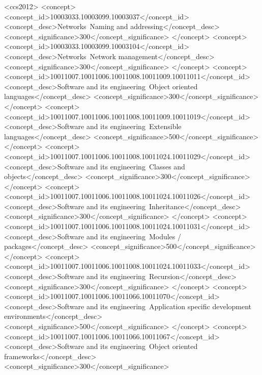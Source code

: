 \documentclass[sigconf]{acmart}
\begin{document}
\begin{CCSXML}
<ccs2012>
   <concept>
       <concept_id>10003033.10003099.10003037</concept_id>
       <concept_desc>Networks~Naming and addressing</concept_desc>
       <concept_significance>300</concept_significance>
       </concept>
   <concept>
       <concept_id>10003033.10003099.10003104</concept_id>
       <concept_desc>Networks~Network management</concept_desc>
       <concept_significance>300</concept_significance>
       </concept>
   <concept>
       <concept_id>10011007.10011006.10011008.10011009.10011011</concept_id>
       <concept_desc>Software and its engineering~Object oriented languages</concept_desc>
       <concept_significance>300</concept_significance>
       </concept>
   <concept>
       <concept_id>10011007.10011006.10011008.10011009.10011019</concept_id>
       <concept_desc>Software and its engineering~Extensible languages</concept_desc>
       <concept_significance>500</concept_significance>
       </concept>
   <concept>
       <concept_id>10011007.10011006.10011008.10011024.10011029</concept_id>
       <concept_desc>Software and its engineering~Classes and objects</concept_desc>
       <concept_significance>300</concept_significance>
       </concept>
   <concept>
       <concept_id>10011007.10011006.10011008.10011024.10011026</concept_id>
       <concept_desc>Software and its engineering~Inheritance</concept_desc>
       <concept_significance>300</concept_significance>
       </concept>
   <concept>
       <concept_id>10011007.10011006.10011008.10011024.10011031</concept_id>
       <concept_desc>Software and its engineering~Modules / packages</concept_desc>
       <concept_significance>500</concept_significance>
       </concept>
   <concept>
       <concept_id>10011007.10011006.10011008.10011024.10011033</concept_id>
       <concept_desc>Software and its engineering~Recursion</concept_desc>
       <concept_significance>300</concept_significance>
       </concept>
   <concept>
       <concept_id>10011007.10011006.10011066.10011070</concept_id>
       <concept_desc>Software and its engineering~Application specific development environments</concept_desc>
       <concept_significance>500</concept_significance>
       </concept>
   <concept>
       <concept_id>10011007.10011006.10011066.10011067</concept_id>
       <concept_desc>Software and its engineering~Object oriented frameworks</concept_desc>
       <concept_significance>300</concept_significance>

\end{CCSXML}
\end{document}
